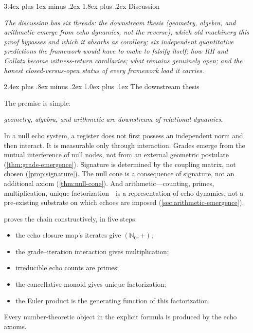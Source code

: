 \documentclass[11pt,a4paper]{article}
\makeatletter
\theoremstyle{plain}
\theoremstyle{definition}
\theoremstyle{remark}
\numberwithin{equation}{section}
\newcommand{\Nat}{\mathbb{N}}
\renewcommand{\section}{%
  \@startsection{section}{1}{0pt}%
    {3.4ex plus 1ex minus .2ex}%
    {1.8ex plus .2ex}%
    {\normalfont\LARGE\bfseries\color{headingAccent}}%
}
\renewcommand{\subsection}{%
  \@startsection{subsection}{2}{0pt}%
    {2.4ex plus .8ex minus .2ex}%
    {1.0ex plus .1ex}%
    {\normalfont\Large\bfseries\color{headingAccent}}%
}
\newenvironment{sectionopener}
  {\begin{sectionopenerframe}\small\itshape\ignorespaces}
  {\end{sectionopenerframe}}
\makeatother
\begin{document}
\section{Discussion}
\label{sec:discussion}

\begin{sectionopener}
The discussion has six threads: the downstream thesis (geometry,
algebra, and arithmetic emerge from echo dynamics, not the reverse);
which old machinery this proof bypasses and which it absorbs as
corollary; six independent quantitative predictions the framework
would have to make to falsify itself; how RH and Collatz become
witness-return corollaries; what remains genuinely open; and the
honest closed-versus-open status of every framework load it carries.
\end{sectionopener}

\subsection{The downstream thesis}

The premise is simple:

\begin{center}
\emph{geometry, algebra, and arithmetic are downstream of relational
dynamics.}
\end{center}

In a null echo system, a register does not first possess an independent
norm and then interact.  It is measurable only through interaction.
Grades emerge from the mutual interference of null nodes,
not from an external geometric postulate (\cref{thm:grade-emergence}).
Signature is determined by the coupling matrix, not chosen
(\cref{prop:signature}).  The null cone is a consequence of signature,
not an additional axiom (\cref{thm:null-cone}).  And arithmetic---counting,
primes, multiplication, unique factorization---is a representation
of echo dynamics, not a pre-existing substrate on which echoes are
imposed (\cref{sec:arithmetic-emergence}).

\medskip

 proves the chain constructively, in
five steps:
\begin{itemize}
\item the echo closure map's iterates give \((\Nat_0,+)\);
\item the grade--iteration interaction gives multiplication;
\item irreducible echo counts are primes;
\item the cancellative monoid gives unique factorization;
\item the Euler product is the generating function of this factorization.
\end{itemize}
Every number-theoretic object in the explicit formula is produced
by the echo axioms.
\end{document}
